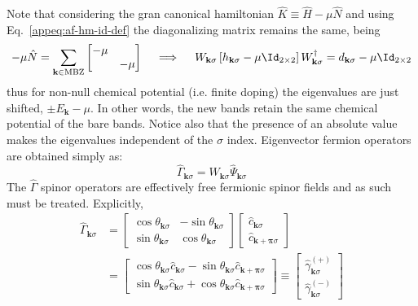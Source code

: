 Note that considering the gran canonical hamiltonian $\hat K \equiv \hat H - \mu\hat N$ and using Eq.~\eqref{appeq:af-hm-id-def} the diagonalizing matrix remains the same, being
\begin{equation}\label{appeq:af-full-h-diagonalization}
	-\mu\hat N = \sum_{\mathbf{k}\in\mathrm{MBZ}} \begin{bmatrix}
		-\mu & \\ & -\mu
	\end{bmatrix}
	\quad\implies\quad
	W_{\mathbf{k}\sigma} \left[ 
	h_{\mathbf{k}\sigma}-\mu \Id_{2\times2}
	\right] W_{\mathbf{k}\sigma}^\dagger = d_{\mathbf{k}\sigma}-\mu \Id_{2\times2}
\end{equation}
thus for non-null chemical potential (i.e. finite doping) the eigenvalues are just shifted, $\pm E_\mathbf{k}-\mu$. In other words, the new bands retain the same chemical potential of the bare bands. Notice also that the presence of an absolute value makes the eigenvalues independent of the $\sigma$ index. Eigenvector fermion operators are obtained simply as:
\begin{equation}\label{appeq:af-hm-Gamma-WPsi}
	\hat\Gamma_{\mathbf{k}\sigma} = W_{\mathbf{k}\sigma} \hat \Psi_{\mathbf{k}\sigma}
\end{equation}
The $\hat\Gamma$ spinor operators are effectively free fermionic spinor fields and as such must be treated. Explicitly,
\begin{align}
	\hat\Gamma_{\mathbf{k}\sigma} &= \begin{bmatrix}
		\cos \theta_{\mathbf{k}\sigma} & - \sin \theta_{\mathbf{k}\sigma} \\
		\sin \theta_{\mathbf{k}\sigma} & \cos \theta_{\mathbf{k}\sigma}
	\end{bmatrix} \begin{bmatrix}
		\hat c_{\mathbf{k}\sigma} \\
		\hat c_{\mathbf{k}+\bm{\pi}\sigma} 
	\end{bmatrix} \nonumber \\
	&= \begin{bmatrix}
		\cos \theta_{\mathbf{k}\sigma} \hat c_{\mathbf{k}\sigma} - \sin \theta_{\mathbf{k}\sigma} \hat c_{\mathbf{k}+\bm{\pi}\sigma}  \\
		\sin \theta_{\mathbf{k}\sigma} \hat c_{\mathbf{k}\sigma} + \cos \theta_{\mathbf{k}\sigma} \hat c_{\mathbf{k}+\bm{\pi}\sigma} 
	\end{bmatrix} \equiv
	\begin{bmatrix}
		\hat \gamma_{\mathbf{k}\sigma}^{(+)} \\
		\hat \gamma_{\mathbf{k}\sigma}^{(-)} 
	\end{bmatrix} \label{appeq:af-hm-gamma-ops-transform}
\end{align}

